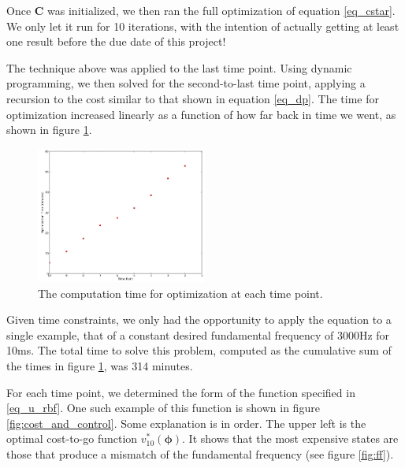 \documentclass{article} %
\begin{document}
Once $\bm{C}$ was initialized, we then ran the full optimization of equation
\eqref{eq_cstar}. We only let it run for 10 iterations, with the intention of
actually getting at least one result before the due date of this project!

The technique above was applied to the last time point. Using dynamic programming,
we then solved for the second-to-last time point, applying a recursion to the cost
similar to that shown in equation \eqref{eq_dp}. The time for optimization increased
linearly as a function of how far back in time we went, as shown in figure \ref{fig:optimization_time}.

\begin{figure}[h]
\centering
\includegraphics[width=0.5\textwidth]{images/optimization_time.png}
\caption{The computation time for optimization at each time point.}
\label{fig:optimization_time}
\end{figure}

Given time constraints, we only had the opportunity to apply the equation to a single
example, that of a constant desired fundamental frequency of 3000Hz for 10ms. The total
time to solve this problem, computed as the cumulative sum of the times in figure
\ref{fig:optimization_time}, was 314 minutes.

For each time point, we determined the form of the function specified in \eqref{eq_u_rbf}. One
such example of this function is shown in figure \ref{fig:cost_and_control}. Some explanation
is in order. The upper left is the optimal cost-to-go function $v_{10}^*(\bm{\phi})$. It
shows that the most expensive states are those that produce a mismatch of the fundamental
frequency (see figure \ref{fig:ff}).
\end{document}
